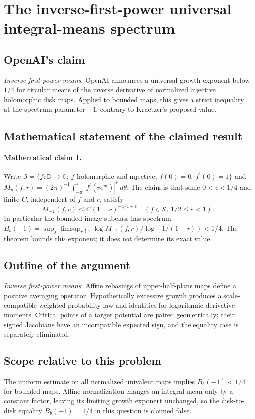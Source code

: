 \documentclass[11pt]{article}
\begin{document}
\section*{The inverse-first-power universal integral-means spectrum}

\subsection{OpenAI's claim}
\textit{Inverse first-power means}: OpenAI announces a universal growth exponent below $1/4$ for circular means of the inverse derivative of normalized injective holomorphic disk maps. Applied to bounded maps, this gives a strict inequality at the spectrum parameter $-1$, contrary to Kraetzer’s proposed value.

\subsection{Mathematical statement of the claimed result}
\paragraph{Mathematical claim 1.} Write $\mathcal S=\{f:\mathbb D\to\mathbb C:\ f\text{ holomorphic and injective},\ f(0)=0,\ f^\prime(0)=1\}$ and $M_p(f,r)=(2\pi)^{-1}\int_{-\pi}^{\pi}|f^\prime(re^{i\theta})|^p\,d\theta$. The claim is that some $0<\epsilon<1/4$ and finite $C$, independent of $f$ and $r$, satisfy \[M_{-1}(f,r)\le C(1-r)^{-1/4+\epsilon}\quad(f\in\mathcal S,\ 1/2\le r<1).\] In particular the bounded-image subclass has spectrum $B_b(-1)=\sup_f\limsup_{r\uparrow1}\log M_{-1}(f,r)/\log(1/(1-r))<1/4$. The theorem bounds this exponent; it does not determine its exact value.

\subsection{Outline of the argument}
\textit{Inverse first-power means}: Affine rebasings of upper-half-plane maps define a positive averaging operator. Hypothetically excessive growth produces a scale-compatible weighted probability law and identities for logarithmic-derivative moments. Critical points of a target potential are paired geometrically; their signed Jacobians have an incompatible expected sign, and the equality case is separately eliminated.

\subsection{Scope relative to this problem}
The uniform estimate on all normalized univalent maps implies $B_b(-1)<1/4$ for bounded maps. Affine normalization changes an integral mean only by a constant factor, leaving its limiting growth exponent unchanged, so the disk-to-disk equality $B_b(-1)=1/4$ in this question is claimed false.
\end{document}
